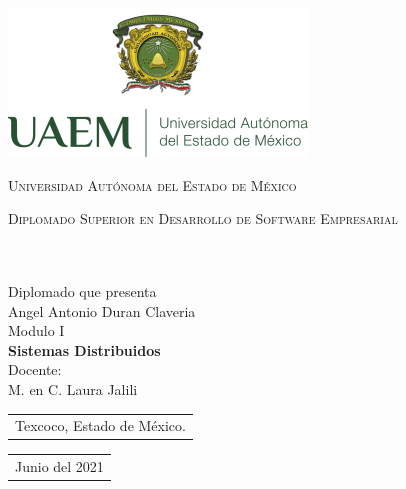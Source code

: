 \documentclass[
12pt, 
spanish, 
onehalfspacing, 
liststotoc, 
toctotoc, 
headsepline, 
]{MastersDoctoralThesis}
\begin{document}
\frontmatter 
\pagestyle{plain} 



\begin{titlepage}
	\centering \includegraphics[scale=0.75,bb=0 0 150 150]{uaemex.png} 
\begin{center}
{\scshape\LARGE \textsc{\LARGE Universidad Aut\'{o}noma del Estado de M\'{e}xico}\par}\vspace{0.8cm} 
\textsc{\Large Diplomado Superior en Desarrollo de Software Empresarial}\\[0.8cm] 
\HRule \\[0.4cm] 
{\Large \bfseries \ttitle\par}\vspace{0.2cm} 
\HRule \\[0.8cm] 
\Large {Diplomado que presenta}\\
\Large {{Angel Antonio Duran Claveria}{\authorname} }\\ 
\bigskip
\Large{Modulo I}\\
\Large{\textbf{Sistemas Distribuidos}}\\
\bigskip
\Large{Docente:}\\
\Large{{M. en C. Laura Jalili}{\supname} }\\
\vspace{1.0cm}
\noindent
\begin{tabular}[t]{@{}l} 
  Texcoco, Estado de M\'{e}xico.
\end{tabular}
\hfill
\begin{tabular}[t]{l@{}}
   Junio del 2021
\end{tabular}
 \vfill
\end{center}
\end{titlepage}

\mainmatter 
\pagestyle{thesis} 
\newcommand{\keyword}[1]{\textbf{#1}}
\newcommand{\tabhead}[1]{\textbf{#1}}
\newcommand{\code}[1]{\texttt{#1}}
\newcommand{\file}[1]{\texttt{\bfseries#1}}
\newcommand{\option}[1]{\texttt{\itshape#1}}
\tableofcontents

%

\printbibliography[heading=bibintoc]
\end{document}
